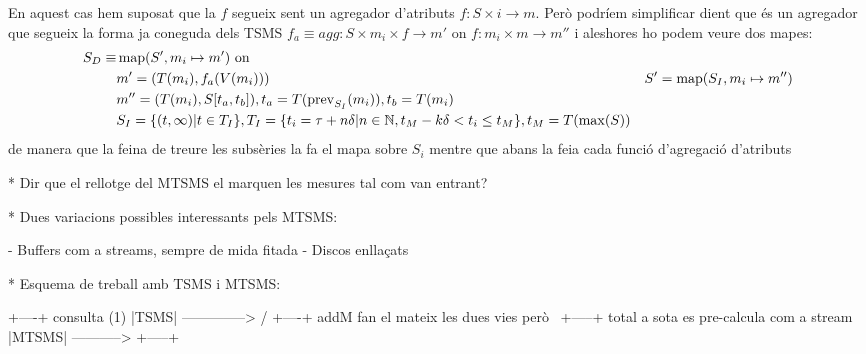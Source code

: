 En aquest cas hem suposat que la $f$ segueix sent un agregador d'atributs $f:S\times i\rightarrow m$. Però podríem simplificar dient que és un agregador que segueix la forma ja coneguda dels TSMS $f_a \equiv agg:S\times m_i \times f \rightarrow m'$ on $f:m_i\times m\rightarrow m''$ i aleshores ho podem veure dos mapes:
  \begin{align*}
    S_D \equiv &  \operatorname{map}(S', m_i\mapsto m') \text{ on }  \\
    & m' = (T(m_i), f_a(V(m_i)))
    & S' = \operatorname{map}(S_I, m_i\mapsto m'') \\
    & m'' = (T(m_i), S[t_a,t_b]), t_a = T(\operatorname{prev}_{S_I}(m_i)), t_b=T(m_i) \\
    &  S_I = \{ (t,\infty) | t\in T_I  \}, T_I = \{ t_i = \tau+n\delta | n\in\mathbb{N}, t_M - k\delta < t_i \leq t_M \}, t_M = T(\max(S))
  \end{align*}
de manera que la feina de treure les subsèries la fa el mapa sobre $S_i$ mentre que abans la feia cada funció d'agregació d'atributs



* Dir que el rellotge del MTSMS el marquen les mesures tal com van entrant?

* Dues variacions possibles interessants pels MTSMS:

 
  - Buffers com a streams, sempre de mida fitada 
  - Discos enllaçats

* Esquema de treball amb TSMS i MTSMS:


        +----+  consulta (1)
        |TSMS| --------------> 
     /  +----+
addM                              fan el mateix les dues vies però
     \  +-----+  total            a sota es pre-calcula com a stream
        |MTSMS| -----------> 
        +-----+












